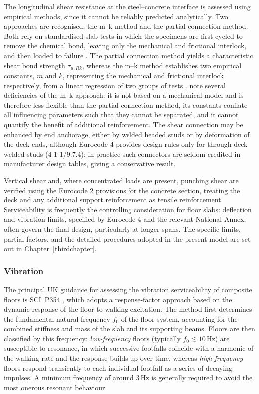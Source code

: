 The longitudinal shear resistance at the steel--concrete interface is assessed using empirical methods, since it cannot be reliably predicted analytically. Two approaches are recognised: the m--k method and the partial connection method. Both rely on standardised slab tests in which the specimens are first cycled to remove the chemical bond, leaving only the mechanical and frictional interlock, and then loaded to failure \citep{RefWorks:stark1990plastic}. The partial connection method yields a characteristic shear bond strength $\tau_{u,Rk}$, whereas the m--k method establishes two empirical constants, $m$ and $k$, representing the mechanical and frictional interlock respectively, from a linear regression of two groups of tests \citep{RefWorks:porter1976design}. \citet{RefWorks:bode1993modern} note several deficiencies of the m--k approach: it is not based on a mechanical model and is therefore less flexible than the partial connection method, its constants conflate all influencing parameters such that they cannot be separated, and it cannot quantify the benefit of additional reinforcement. The shear connection may be enhanced by end anchorage, either by welded headed studs or by deformation of the deck ends, although Eurocode 4 provides design rules only for through-deck welded studs (4-1-1/9.7.4); in practice such connectors are seldom credited in manufacturer design tables, giving a conservative result.

Vertical shear and, where concentrated loads are present, punching shear are verified using the Eurocode 2 provisions for the concrete section, treating the deck and any additional support reinforcement as tensile reinforcement. Serviceability is frequently the controlling consideration for floor slabs: deflection and vibration limits, specified by Eurocode 4 and the relevant National Annex, often govern the final design, particularly at longer spans. The specific limits, partial factors, and the detailed procedures adopted in the present model are set out in Chapter~\ref{thirdchapter}.

\subsubsection*{Vibration}
The principal UK guidance for assessing the vibration serviceability of composite floors is SCI~P354 \citep{RefWorks:hicks2009p354}, which adopts a response-factor approach based on the dynamic response of the floor to walking excitation. The method first determines the fundamental natural frequency $f_0$ of the floor system, accounting for the combined stiffness and mass of the slab and its supporting beams. Floors are then classified by this frequency: \emph{low-frequency} floors (typically $f_0 \lesssim 10$\,Hz) are susceptible to resonance, in which successive footfalls coincide with a harmonic of the walking rate and the response builds up over time, whereas \emph{high-frequency} floors respond transiently to each individual footfall as a series of decaying impulses. A minimum frequency of around 3\,Hz is generally required to avoid the most onerous resonant behaviour.

